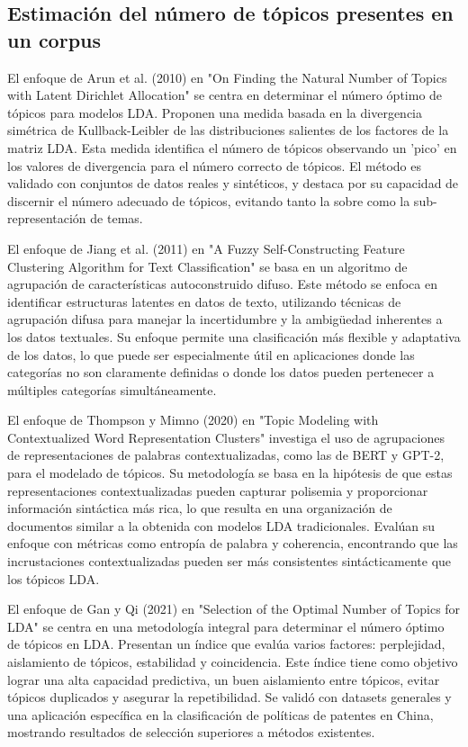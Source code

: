 \subsection{Estimaci\'on del n\'umero de t\'opicos presentes en un corpus}

El enfoque de Arun et al. (2010) en "On Finding the Natural Number of Topics with Latent Dirichlet Allocation" se centra en determinar el número óptimo de tópicos para modelos LDA. Proponen una medida basada en la divergencia simétrica de Kullback-Leibler de las distribuciones salientes de los factores de la matriz LDA. Esta medida identifica el número de tópicos observando un 'pico' en los valores de divergencia para el número correcto de tópicos. El método es validado con conjuntos de datos reales y sintéticos, y destaca por su capacidad de discernir el número adecuado de tópicos, evitando tanto la sobre como la sub-representación de temas.

El enfoque de Jiang et al. (2011) en "A Fuzzy Self-Constructing Feature Clustering Algorithm for Text Classification" se basa en un algoritmo de agrupación de características autoconstruido difuso. Este método se enfoca en identificar estructuras latentes en datos de texto, utilizando técnicas de agrupación difusa para manejar la incertidumbre y la ambigüedad inherentes a los datos textuales. Su enfoque permite una clasificación más flexible y adaptativa de los datos, lo que puede ser especialmente útil en aplicaciones donde las categorías no son claramente definidas o donde los datos pueden pertenecer a múltiples categorías simultáneamente.

El enfoque de Thompson y Mimno (2020) en "Topic Modeling with Contextualized Word Representation Clusters" investiga el uso de agrupaciones de representaciones de palabras contextualizadas, como las de BERT y GPT-2, para el modelado de tópicos. Su metodología se basa en la hipótesis de que estas representaciones contextualizadas pueden capturar polisemia y proporcionar información sintáctica más rica, lo que resulta en una organización de documentos similar a la obtenida con modelos LDA tradicionales. Evalúan su enfoque con métricas como entropía de palabra y coherencia, encontrando que las incrustaciones contextualizadas pueden ser más consistentes sintácticamente que los tópicos LDA.

El enfoque de Gan y Qi (2021) en "Selection of the Optimal Number of Topics for LDA" se centra en una metodología integral para determinar el número óptimo de tópicos en LDA. Presentan un índice que evalúa varios factores: perplejidad, aislamiento de tópicos, estabilidad y coincidencia. Este índice tiene como objetivo lograr una alta capacidad predictiva, un buen aislamiento entre tópicos, evitar tópicos duplicados y asegurar la repetibilidad. Se validó con datasets generales y una aplicación específica en la clasificación de políticas de patentes en China, mostrando resultados de selección superiores a métodos existentes.

